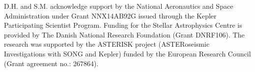 \documentclass[apj,twocolappendix,numberedappendix]{emulateapj}
\renewcommand{\_}{\discretionary{\underscore}{}{\underscore}}  %
\begin{document}
D.H. and S.M. acknowledge support by the National Aeronautics and Space Administration under Grant NNX14AB92G issued through the Kepler Participating Scientist Program.
Funding for the Stellar Astrophysics Centre is provided by The Danish National Research Foundation (Grant DNRF106). The research was supported by the ASTERISK project (ASTERoseismic Investigations with SONG and Kepler) funded by the European Research Council (Grant agreement no.: 267864).

%



\clearpage
\appendix






\clearpage
\tableofcontents
\end{document}
